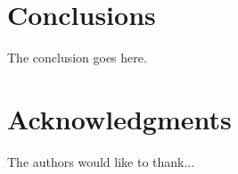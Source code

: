 \documentclass[journal]{IEEEtran}
\begin{document}
%
%







\section{Conclusions}
The conclusion goes here.



\section*{Acknowledgments}


The authors would like to thank...




%

% 
\end{document}
